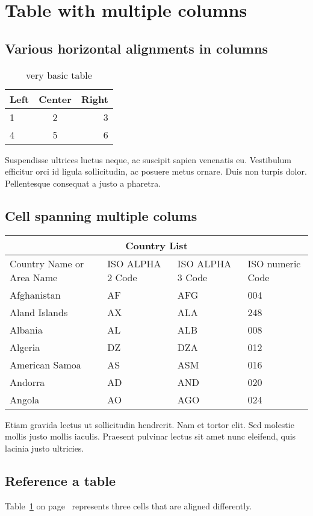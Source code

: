 \section{Table with multiple columns}

\subsection{Various horizontal alignments in columns}

\begin{table}[h]
    \centering
    \begin{tabular}{l | c | r}
        Left & Center & Right \\
        \hline
        1 & 2 & 3 \\
        4 & 5 & 6
    \end{tabular}
    \caption{very basic table}
    \label{tab:left-center-right}
\end{table}

Suspendisse ultrices luctus neque, ac suscipit sapien venenatis eu. Vestibulum efficitur orci id ligula sollicitudin, ac posuere metus ornare. Duis non turpis dolor. Pellentesque consequat a justo a pharetra.\\


\subsection{Cell spanning multiple colums}
\begin{tabular}{ |p{3cm}||p{3cm}|p{3cm}|p{3cm}|  }
    \hline
    \multicolumn{4}{|c|}{Country List} \\
    \hline
    Country Name     or Area Name& ISO ALPHA 2 Code &ISO ALPHA 3 Code&ISO numeric Code\\
    \hline
    Afghanistan   & AF    &AFG&   004\\
    Aland Islands&   AX  & ALA   &248\\
    Albania &AL & ALB&  008\\
    Algeria    &DZ & DZA&  012\\
    American Samoa&   AS  & ASM&016\\
    Andorra& AD  & AND   &020\\
    Angola& AO  & AGO&024\\
    \hline
\end{tabular}

    \vspace{0.5cm}
   Etiam gravida lectus ut sollicitudin hendrerit. Nam et tortor elit. Sed molestie mollis justo mollis iaculis. Praesent pulvinar lectus sit amet nunc eleifend, quis lacinia justo ultricies.\\

\subsection{Reference a table}
Table~\ref{tab:left-center-right} on page~\pageref{tab:left-center-right} represents three cells that are aligned differently.\\